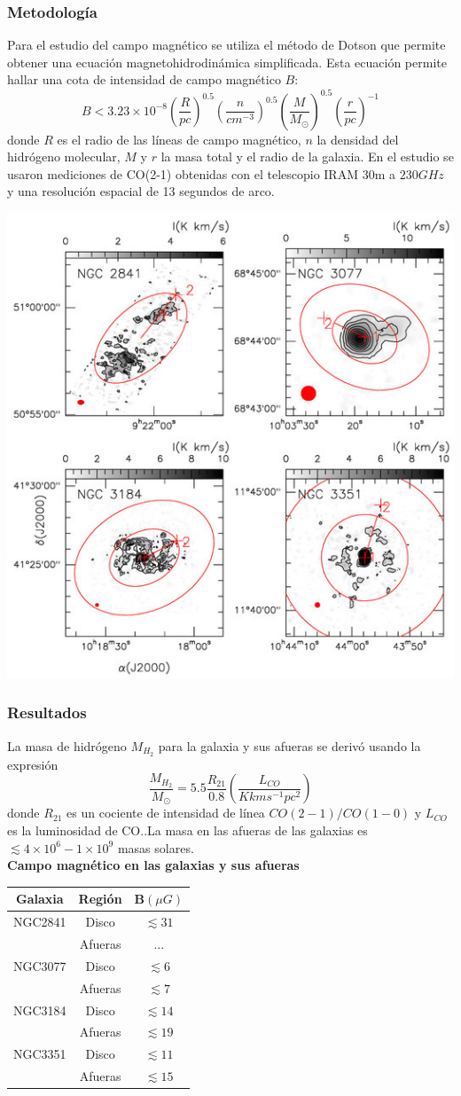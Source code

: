 \documentclass[8pt]{beamer}
\begin{document}
\begin{frame}
\frametitle{Metodología}
Para el estudio del campo magnético se utiliza el método de Dotson que permite obtener una ecuación magnetohidrodinámica simplificada. Esta ecuación permite hallar una cota de intensidad de campo magnético $B$:
\begin{equation*}
    B<3.23\times 10^{-8}\left(\frac{R}{pc}\right)^{0.5}\left(\frac{n}{cm^{-3}}\right)^{0.5}\left(\frac{M}{M_{\odot }}\right)^{0.5}\left(\frac{r}{pc}\right)^{-1}
\end{equation*}
donde $R$ es el radio de las líneas de campo magnético, $n$ la densidad del hidrógeno molecular, $M$ y $r$ la masa total y el radio de la galaxia. En el estudio se usaron mediciones de CO(2-1) obtenidas con el telescopio IRAM 30m a $230GHz$ y una resolución espacial de 13 segundos de arco.
\begin{center}
\includegraphics[width=0.3\linewidth]{figures/galaxies.jpg}
\end{center}
\end{frame}
\begin{frame}
\frametitle{Resultados }
La masa de hidrógeno $M_{H_2}$ para la galaxia y sus afueras se derivó usando la expresión
\begin{equation*}
    \dfrac{M_{H_2}}{M_{\odot}}=5.5\dfrac{R_{21}}{0.8}\left(\dfrac{L_{CO}}{Kkms^{-1}pc^2}\right)
\end{equation*}
donde $R_{21}$ es un cociente de intensidad de línea $CO(2-1)/CO(1-0)$ y $L_{CO}$ es la luminosidad de CO..La masa en las afueras de las galaxias es $\lesssim 4\times10^{6}-1\times10^{9}$ masas solares.\\

\textbf{Campo magnético en las galaxias y sus afueras}


\begin{center}
\begin{tabular}{ c c c } 
\hline
Galaxia& Región & B$(\mu G)$\\
 \hline
 NGC2841 & Disco & $\lesssim31$ \\
  & Afueras & ... \\
\hline
 NGC3077 & Disco & $\lesssim 6$ \\ 
   & Afueras & $\lesssim 7$ \\
 \hline
 NGC3184 & Disco & $\lesssim 14$ \\
   & Afueras & $\lesssim 19$ \\
\hline
 NGC3351 & Disco & $\lesssim 11$ \\
   & Afueras & $\lesssim 15$ \\

 \hline
\end{tabular}
\end{center}
\end{frame}
\end{document}
